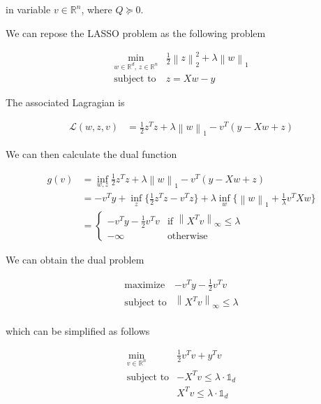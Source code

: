 \documentclass[11pt]{article}
\begin{document}
in variable \(v\in \mathbb{R}^n\), where \(Q \succeq 0\).

    We can repose the LASSO problem as the following problem

\begin{equation}
\tag{LASSO'}
\begin{array}{ll}
\displaystyle \min_{w \in \mathbb{R}^d,\, z \in \mathbb{R}^n} & \frac{1}{2} \left\lVert z \right\rVert^2_2 + \lambda \left\lVert w \right\rVert_1 \\
\text{subject to} & z = Xw - y 
\end{array}
\end{equation}

The associated Lagragian is

\begin{align*}
\mathcal{L}(w, z, v) &= \frac{1}{2} z^T z + \lambda \left\lVert w \right\rVert_1 - v^T (y-Xw+z)
\end{align*}

We can then calculate the dual function

\begin{align*}
g(v) &= \inf_{w, z} \frac{1}{2} z^T z + \lambda \left\lVert w \right\rVert_1 - v^T (y-Xw+z) \\
&= - v^T y + \inf_z \{ \frac{1}{2} z^T z - v^T z\} + \lambda \inf_w \{\left\lVert w \right\rVert_1 + \frac{1}{\lambda} v^T X w\} \\
&= \left\{ \begin{array}{ll} - v^T y - \frac{1}{2} v^T v & \text{if } \left\lVert X^T v \right\lVert_{\infty} \le \lambda \\
- \infty & \text{otherwise} \end{array}\right.
\end{align*}

We can obtain the dual problem

\begin{equation}
\tag{LASSO*}
\begin{array}{ll}
\text{maximize} & - v^T y - \frac{1}{2} v^T v \\
\text{subject to} & \left\lVert X^T v \right\lVert_{\infty} \le \lambda \\
\end{array}
\end{equation}

which can be simplified as follows

\begin{equation}
\tag{LASSO*}
\begin{array}{ll}
\displaystyle \min_{v \in \mathbb{R}^n} & \frac{1}{2} v^T v  + y^T v \\
\text{subject to} & - X^T v \le \lambda \cdot \mathbb{1}_d \\
& X^T v \le \lambda \cdot \mathbb{1}_d
\end{array}
\end{equation}
\end{document}
